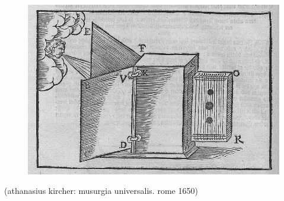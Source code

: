 \documentclass[12pt,a4paper,british,landscape]{article}
\begin{document}
\begin{figure}[h]
    \vspace{1cm}
    \begin{center}
        \includegraphics[scale=0.6]{ harp0.png }
    \end{center}
\end{figure}

\begin{center}
    (athanasius kircher: musurgia universalis. rome 1650)
\end{center}
\end{document}
